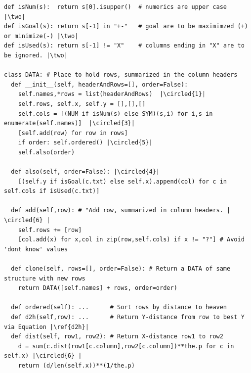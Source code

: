  \begin{listing}[!b]
\begin{verbatim}   
def isNum(s):  return s[0].isupper()  # numerics are upper case  |\two|
def isGoal(s): return s[-1] in "+-"   # goal are to be maximimzed (+) or minimize(-) |\two|  
def isUsed(s): return s[-1] != "X"    # columns ending in "X" are to be ignored. |\two|

class DATA: # Place to hold rows, summarized in the column headers 
  def __init__(self, headerAndRows=[], order=False):
    self.names,*rows = list(headerAndRows)  |\circled{1}|
    self.rows, self.x, self.y = [],[],[] 
    self.cols = [(NUM if isNum(s) else SYM)(s,i) for i,s in enumerate(self.names)]  |\circled{3}|
    [self.add(row) for row in rows]
    if order: self.ordered() |\circled{5}|
    self.also(order)

  def also(self, order=False): |\circled{4}|
    [(self.y if isGoal(c.txt) else self.x).append(col) for c in self.cols if isUsed(c.txt)] 
    
  def add(self,row): # "Add row, summarized in column headers. | \circled{6} |   
    self.rows += [row]
    [col.add(x) for x,col in zip(row,self.cols) if x != "?"] # Avoid 'dont know' values 

  def clone(self, rows=[], order=False): # Return a DATA of same structure with new rows
    return DATA([self.names] + rows, order=order)

  def ordered(self): ...      # Sort rows by distance to heaven 
  def d2h(self,row): ...      # Return Y-distance from row to best Y via Equation |\ref{d2h}|
  def dist(self, row1, row2): # Return X-distance row1 to row2  
    d = sum(c.dist(row1[c.column],row2[c.column])**the.p for c in self.x) |\circled{6} |
    return (d/len(self.x))**(1/the.p)


\end{verbatim}
\end{listing}
